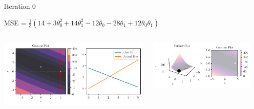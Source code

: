 \documentclass{beamer}
\begin{document}
\begin{frame}{Iteration 0}

MSE = $\frac{1}{3}(14+3\theta_{0}^{2}+14\theta_{1}^{2}-12\theta_{0}-28\theta_{1}+12\theta_{0}\theta_{1})$\\

\begin{columns}
\begin{column}{0.6\textwidth}
\begin{adjustbox}{max totalsize={\textwidth},center}
\includegraphics[width=\textwidth]{../../maths/assets/mathematical-ml/figures/gradient-descent-0.pdf}
\end{adjustbox}

\end{column}
\begin{column}{0.5\textwidth}
\begin{adjustbox}{max totalsize={\textwidth},center}
\includegraphics[width=\textwidth]{../../maths/assets/mathematical-ml/figures/contour-linreg-0.pdf}
\end{adjustbox}
\end{column}
\end{columns}




\end{frame}
\end{document}
